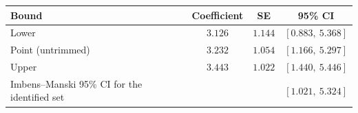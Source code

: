 \begin{tabular}{lccc}
\toprule
Bound & Coefficient & SE & 95\% CI \\
\midrule
Lower & $3.126$ & $1.144$ & $[0.883,\ 5.368]$ \\
Point (untrimmed) & $3.232$ & $1.054$ & $[1.166,\ 5.297]$ \\
Upper & $3.443$ & $1.022$ & $[1.440,\ 5.446]$ \\
\midrule
Imbens--Manski 95\% CI for the identified set &  &  & $[1.021,\ 5.324]$ \\
\bottomrule
\end{tabular}
